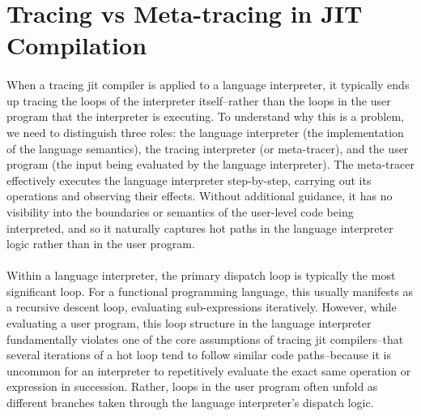 


    \section[\texorpdfstring{Tracing vs Meta-tracing in JIT Compilation}{Tracing vs Meta-tracing}]{Tracing vs Meta-tracing in JIT Compilation}
    \label{section:tracing-meta-tracing}

        \paragraph{}%
            When a tracing \gls{jit} compiler is applied to a language interpreter, it typically ends up tracing the loops of the interpreter itself--rather than the loops in the user program that the interpreter is executing. To understand why this is a problem, we need to distinguish three roles: the language interpreter (the implementation of the language semantics), the tracing interpreter (or meta-tracer), and the user program (the input being evaluated by the language interpreter). The meta-tracer effectively executes the language interpreter step-by-step, carrying out its operations and observing their effects. Without additional guidance, it has no visibility into the boundaries or semantics of the user-level code being interpreted, and so it naturally captures hot paths in the language interpreter logic rather than in the user program.

        \paragraph{}%
            Within a language interpreter, the primary dispatch loop is typically the most significant loop. For a functional programming language, this usually manifests as a recursive descent loop, evaluating sub-expressions iteratively. However, while evaluating a user program, this loop structure in the language interpreter fundamentally violates one of the core assumptions of tracing \gls{jit} compilers--that several iterations of a hot loop tend to follow similar code paths--because it is uncommon for an interpreter to repetitively evaluate the exact same operation or expression in succession. Rather, loops in the user program often unfold as different branches taken through the language interpreter’s dispatch logic.

